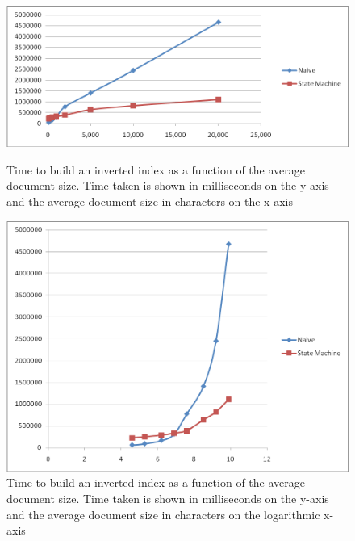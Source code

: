 \documentclass[10pt]{article}
\begin{document}
\begin{figure}[ht]
  \begin{minipage}[b]{0.5\linewidth}
    \centering
    \includegraphics[width=\textwidth]{naivedocumentsize}
    \caption{Time to build an inverted index as a function of the
      average document size. Time taken is shown in milliseconds on the
      y-axis and the average document size in characters on the x-axis}
    \label{fig:naivedocumentsize}
  \end{minipage}
  \hspace{0.5cm}
  \begin{minipage}[b]{0.5\linewidth}
    \centering
    \includegraphics[width=\textwidth]{naivedocumentsizelog}
    \caption{Time to build an inverted index as a function of the
      average document size. Time taken is shown in milliseconds on the
      y-axis and the average document size in characters on the
      logarithmic x-axis}
    \label{fig:naivedocumentsizelog}
  \end{minipage}
\end{figure}


\end{document}
